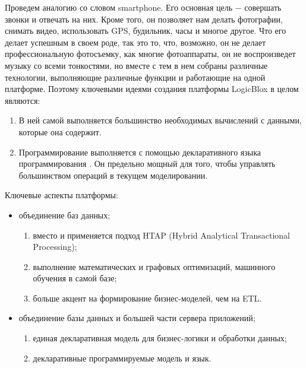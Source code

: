 Проведем аналогию со словом smartphone. Его основная цель ​− совершать звонки и отвечать на них. Кроме того, он позволяет нам делать фотографии, снимать видео, использовать GPS, будильник, часы и многое другое. Что его делает успешным в своем роде, так это то, что, возможно, он не делает профессиональную фотосъемку, как многие фотоаппараты, он не воспроизведет музыку со всеми тонкостями, но вместе с тем в нем собраны различные технологии, выполняющие различные функции и работающие на одной платформе. Поэтому ключевыми идеями создания платформы LogicBlox в целом являются:
\begin{enumerate}
  \item В ней самой выполняется большинство необходимых вычислений с данными, которые она содержит.
  \item Программирование выполняется с помощью декларативного языка программирования \logiql. Он предельно мощный для того, чтобы управлять большинством операций в текущем моделировании.
\end{enumerate}

Ключевые аспекты платформы:
\begin{itemize}
  \item объединение баз данных;
    \begin{enumerate}[leftmargin=5.5mm]
      \item вместо \olap и \oltp применяется подход HTAP (Hybrid Ana\-ly\-ti\-cal Transactional Processing);
      \item выполнение математических и графовых оптимизаций, машинного обучения в самой базе;
      \item больше акцент на формирование бизнес-моделей, чем на ETL.
    \end{enumerate}
  \item объединение базы данных и большей части сервера приложений;
  \begin{enumerate}[leftmargin=5.5mm]
    \item единая декларативная модель для бизнес-логики и обработки данных;
    \item декларативные программируемые модель и язык.
  \end{enumerate}
\end{itemize}
